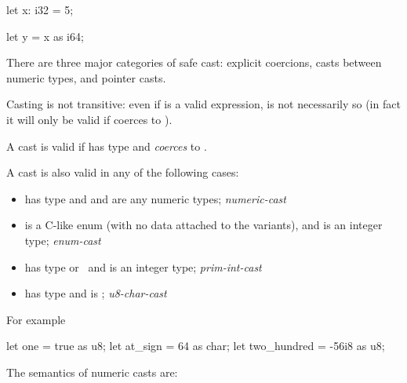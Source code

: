 \begin{rustc}
let x: i32 = 5;

let y = x as i64;
\end{rustc}

There are three major categories of safe cast: explicit coercions, casts between numeric types, and pointer casts.

\blank

Casting is not transitive: even if  is a valid expression,  is not necessarily so (in fact it will 
only be valid if  coerces to ).


A cast  is valid if  has type  and  \emph{coerces} to .


A cast  is also valid in any of the following cases:

\begin{itemize}
  \item{ has type  and  and  are any numeric types; \emph{numeric-cast}}
  \item{ is a C-like enum (with no data attached to the variants), and  is an integer type; \emph{enum-cast}}
  \item{ has type  or \varchar\ and  is an integer type; \emph{prim-int-cast}}
  \item{ has type  and  is \varchar; \emph{u8-char-cast}}
\end{itemize}

For example

\begin{rustc}
let one = true as u8;
let at_sign = 64 as char;
let two_hundred = -56i8 as u8;
\end{rustc}

The semantics of numeric casts are:

